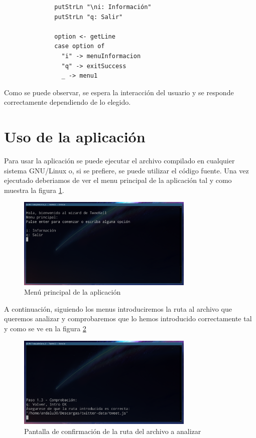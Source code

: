 \documentclass[11pt]{article}
\begin{document}
\begin{itemize}
\begin{itemize}
\begin{verbatim}
              putStrLn "\ni: Información"
              putStrLn "q: Salir"
            
              option <- getLine
              case option of
                "i" -> menuInformacion
                "q" -> exitSuccess
                _ -> menu1
        \end{verbatim}
        
        Como se puede observar, se espera la interacción del usuario y se responde correctamente dependiendo de lo elegido.
        
        
        
    \end{itemize}
    
\end{itemize}

\section{Uso de la aplicación}
Para usar la aplicación se puede ejecutar el archivo compilado en cualquier sistema GNU/Linux o, si se prefiere, se puede utilizar el código fuente.
Una vez ejecutado deberiamos de ver el menu principal de la aplicación tal y como muestra la figura \ref{fig_menuprincipal}.

\begin{figure}[h]
    \centering
    \includegraphics[width=0.75\textwidth]{menuPrincipal.png}
    \caption{Menú principal de la aplicación}
    \label{fig_menuprincipal}
\end{figure}
\medskip

A continuación, siguiendo los menus introduciremos la ruta al archivo que queremos analizar y comprobaremos que lo hemos introducido correctamente tal y como se ve en la figura \ref{fig_comprobacion}

\begin{figure}[h]
    \centering
	\includegraphics[width=0.75\textwidth]{comprobacion.png}
    \caption{Pantalla de confirmación de la ruta del archivo a analizar}
    \label{fig_comprobacion}
\end{figure}
\medskip
\end{document}
